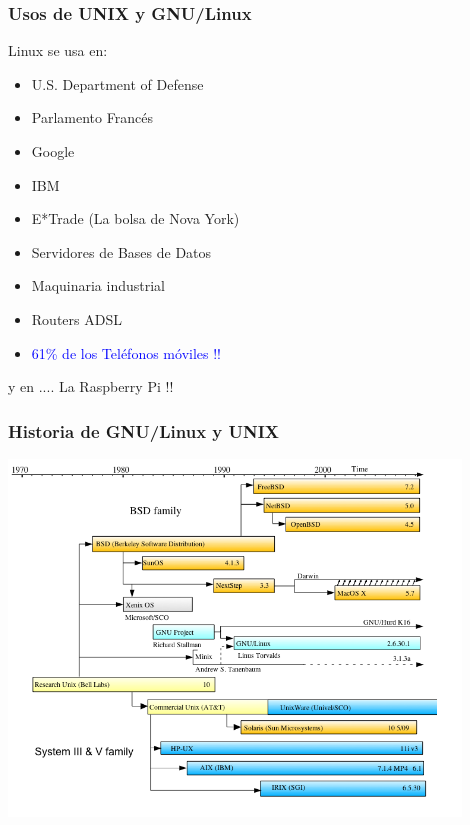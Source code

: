\documentclass[colorlinks,10pt]{beamer}
\begin{document}
\begin{frame}
  \frametitle{Usos de UNIX y GNU/Linux}
  \begin{block}{Linux se usa en:}
    \begin{itemize}
    \item U.S. Department of Defense
    \item  Parlamento Francés
    \item Google
    \item IBM
    \item E*Trade (La bolsa de Nova York)
    \item Servidores de Bases de Datos
    \item Maquinaria industrial
    \item Routers ADSL
    \item \textcolor{blue}{61\% de los Teléfonos móviles !!}
    \end{itemize}
  \end{block}
 \pause 
 \begin{block}{y en ....}
   La Raspberry Pi !!
 \end{block}
\end{frame}



\begin{frame}
  \frametitle{Historia de GNU/Linux y UNIX}
  \pause \begin{center}
    \includegraphics[width=0.9\textwidth]{figs/unixhistory} \\
  \end{center}
\end{frame}
\end{document}

